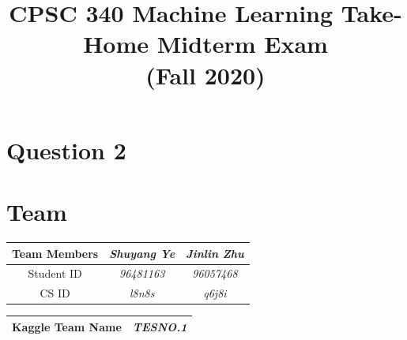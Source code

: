 
\lstset{style=mystyle}
\def\R{\mathbb{R}}
\def\argmax{\mathop{\rm arg\,max}}
\def\argmin{\mathop{\rm arg\,min}}
\newcommand{\mat}[1]{\begin{bmatrix}#1\end{bmatrix}}
\newcommand{\alignStar}[1]{\begin{align*}#1\end{align*}}
\def\half{\frac 1 2}

\newcommand{\fig}[2]{\texttt{[image: \#2]}}
\newcommand{\centerfig}[2]{\begin{center}\texttt{[image: \#2]}\end{center}}
\def\items#1{\begin{itemize}#1\end{itemize}}
\def\enum#1{\begin{enumerate}#1\end{enumerate}}



\title{CPSC 340 Machine Learning Take-Home Midterm Exam\\ (Fall 2020)}


\section*{Question 2}
\setcounter{section}{0}

\section{Team}
\begin{tabular}{|c | c | c |} 
\hline
Team Members & \emph{Shuyang Ye} & \emph{Jinlin Zhu} \\
\hline
Student ID & \emph{96481163} & \emph{96057468} \\
\hline
CS ID & \emph{l8n8s} & \emph{q6j8i} \\
\hline
\end{tabular}
\begin{tabular}{|c | c |} 
\hline
Kaggle Team Name & \emph{TESNO.1}\\
\hline
\end{tabular}
